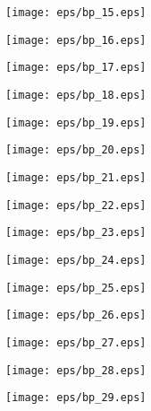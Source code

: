 \documentclass{book}
\begin{document}
	\clearpage\begin{figure}[p]
    \centering
	\texttt{[image: eps/bp\_15.eps]}
	\end{figure}
	\clearpage\begin{figure}[p]
    \centering
	\texttt{[image: eps/bp\_16.eps]}
	\end{figure}
	\clearpage\begin{figure}[p]
    \centering
	\texttt{[image: eps/bp\_17.eps]}
	\end{figure}
	\clearpage\begin{figure}[p]
    \centering
	\texttt{[image: eps/bp\_18.eps]}
	\end{figure}
	\clearpage\begin{figure}[p]
    \centering
	\texttt{[image: eps/bp\_19.eps]}
	\end{figure}
	\clearpage\begin{figure}[p]
    \centering
	\texttt{[image: eps/bp\_20.eps]}
	\end{figure}
	\clearpage\begin{figure}[p]
    \centering
	\texttt{[image: eps/bp\_21.eps]}
	\end{figure}
	\clearpage\begin{figure}[p]
    \centering
	\texttt{[image: eps/bp\_22.eps]}
	\end{figure}
	\clearpage\begin{figure}[p]
    \centering
	\texttt{[image: eps/bp\_23.eps]}
	\end{figure}
	\clearpage\begin{figure}[p]
    \centering
	\texttt{[image: eps/bp\_24.eps]}
	\end{figure}
	\clearpage\begin{figure}[p]
    \centering
	\texttt{[image: eps/bp\_25.eps]}
	\end{figure}
	\clearpage\begin{figure}[p]
    \centering
	\texttt{[image: eps/bp\_26.eps]}
	\end{figure}
	\clearpage\begin{figure}[p]
    \centering
	\texttt{[image: eps/bp\_27.eps]}
	\end{figure}
	\clearpage\begin{figure}[p]
    \centering
	\texttt{[image: eps/bp\_28.eps]}
	\end{figure}
	\clearpage\begin{figure}[p]
    \centering
	\texttt{[image: eps/bp\_29.eps]}
	\end{figure}
\end{document}
